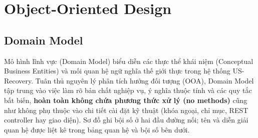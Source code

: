 \section{Object-Oriented Design}\label{object-oriented-design}

\subsection{Domain Model}\label{domain-model}

Mô hình lĩnh vực (Domain Model) biểu diễn các thực thể khái niệm (Conceptual Business Entities) và mối quan hệ ngữ nghĩa thế giới thực trong hệ thống US-Recovery. Tuân thủ nguyên lý phân tích hướng đối tượng (OOA), Domain Model tập trung vào việc làm rõ bản chất nghiệp vụ, ý nghĩa thuộc tính và các quy tắc bất biến, \textbf{hoàn toàn không chứa phương thức xử lý (no methods)} cũng như không phụ thuộc vào chi tiết cài đặt kỹ thuật (khóa ngoại, chỉ mục, REST controller hay giao diện). Sơ đồ ghi bội số ở hai đầu đường nối; tên và diễn giải quan hệ được liệt kê trong bảng quan hệ và bội số bên dưới.

